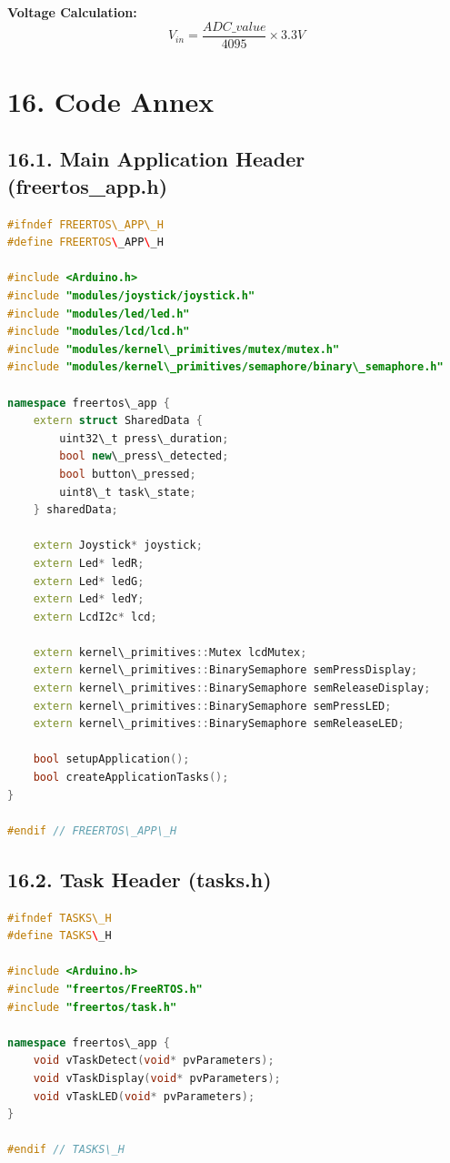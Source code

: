 \documentclass[12pt]{article}
\begin{document}
\textbf{Voltage Calculation:}
$$V_{in} = \frac{ADC\_value}{4095} \times 3.3V$$

\section*{16. Code Annex}

\subsection*{16.1. Main Application Header (freertos\_app.h)}

\begin{lstlisting}[language=C++, caption=freertos\_app.h - Application Interface]
#ifndef FREERTOS\_APP\_H
#define FREERTOS\_APP\_H

#include <Arduino.h>
#include "modules/joystick/joystick.h"
#include "modules/led/led.h"
#include "modules/lcd/lcd.h"
#include "modules/kernel\_primitives/mutex/mutex.h"
#include "modules/kernel\_primitives/semaphore/binary\_semaphore.h"

namespace freertos\_app {
    extern struct SharedData {
        uint32\_t press\_duration;
        bool new\_press\_detected;
        bool button\_pressed;
        uint8\_t task\_state;
    } sharedData;
    
    extern Joystick* joystick;
    extern Led* ledR;
    extern Led* ledG;
    extern Led* ledY;
    extern LcdI2c* lcd;
    
    extern kernel\_primitives::Mutex lcdMutex;
    extern kernel\_primitives::BinarySemaphore semPressDisplay;
    extern kernel\_primitives::BinarySemaphore semReleaseDisplay;
    extern kernel\_primitives::BinarySemaphore semPressLED;
    extern kernel\_primitives::BinarySemaphore semReleaseLED;
    
    bool setupApplication();
    bool createApplicationTasks();
}

#endif // FREERTOS\_APP\_H
\end{lstlisting}

\subsection*{16.2. Task Header (tasks.h)}

\begin{lstlisting}[language=C++, caption=tasks.h - Task Interface]
#ifndef TASKS\_H
#define TASKS\_H

#include <Arduino.h>
#include "freertos/FreeRTOS.h"
#include "freertos/task.h"

namespace freertos\_app {
    void vTaskDetect(void* pvParameters);
    void vTaskDisplay(void* pvParameters);
    void vTaskLED(void* pvParameters);
}

#endif // TASKS\_H
\end{lstlisting}
\end{document}
